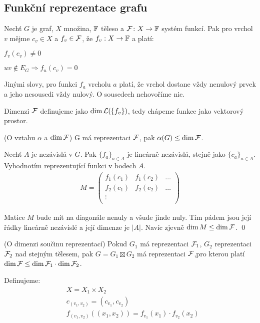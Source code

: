 \subsection{Funkční reprezentace grafu}

\df Nechť $G$ je graf, $X$ množina, $\mathbb{F}$ těleso a $\mathcal{F}\colon X\rightarrow\mathbb{F}$ systém funkcí. Pak pro vrchol $v$ mějme $c_v\in X$ a $f_v \in \mathcal{F}$, že
$f_v: X \to \mathbb{F}$ a platí:
\begin{enumerate*}
	\item $f_v(c_v) \neq 0$
	\item $uv \notin E_G \Rightarrow f_u(c_v) = 0$
\end{enumerate*}
Jinými slovy, pro funkci $f_a$ vrcholu $a$ platí, že vrchol dostane vždy nenulový prvek a jeho nesousedi vždy nulový. O sousedech nehovoříme nic.

\df Dimenzi $\mathcal{F}$ definujeme jako $\dim\mathcal{L}(\{f_v\})$, tedy chápeme funkce
jako vektorový prostor.

\lm(O vztahu $\alpha$ a $\dim\mathcal{F}$) G má reprezentaci $\mathcal{F}$, pak $\alpha(G)
\leq \dim \mathcal{F}$.

\dk Nechť $A$ je nezávislá v $G$. Pak $\{f_a\}_{a\in A}$ je lineárně
nezávislá, stejně jako $\{c_a\}_{a\in A}$. Vyhodnotím reprezentující
funkci v bodech $A$.
\begin{align}
M = \left(
	\begin{matrix}
		f_1(c_1) & f_1(c_2) & \dots \\
		f_2(c_1) & f_2(c_2) & \dots \\
		\vdots &&\\
	\end{matrix}\right)
\end{align}

Matice $M$ bude mít na diagonále nenuly a všude jinde nuly. Tím pádem
jsou její řádky lineárně nezávislé a její dimenze je $|A|$. Navíc zjevně
$\dim M \le \dim\mathcal{F}$.
\qed


\lm(O dimenzi součinu reprezentací) Pokud $G_1$ má reprezentaci $\mathcal{F}_1$,
$G_2$ reprezentaci $\mathcal{F}_2$ nad stejným tělesem, pak $G = G_1 \boxtimes
G_2$ má reprezentaci $\mathcal{F}$,pro kterou platí $\dim\mathcal{F} \leq \dim\mathcal{F}_1 \cdot \dim\mathcal{F}_2$.

\dk Definujeme: 
\begin{align*}
& X = X_1 \times X_2 \\
& c_{(v_1,v_2)} = (c_{v_1}, c_{v_2}) \\
& f_{(v_1, v_2)}((x_1,x_2)) = f_{v_1}(x_1) \cdot f_{v_2}(x_2)
\end{align*}

